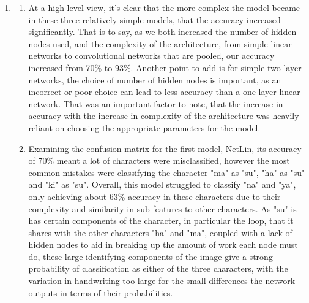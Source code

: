 \documentclass[a4paper,11pt]{article}
\begin{document}
{{\begin{enumerate}[leftmargin=*]
\begin{align*}
\begin{bmatrix}
					3 & 933 & 11 & 4 & 5 & 14 & 6 & 5 & 14 & 10 \\
					2 & 7 & 864 & 15 & 2 & 35 & 16 & 4 & 8 & 0 \\
					1 & 1 & 36 & 947 & 4 & 4 & 3 & 1 & 1 & 2 \\
					32 & 11 & 17 & 7 & 928 & 5 & 6 & 6 & 5 & 5 \\
					1 & 1 & 5 & 3 & 3 & 901 & 1 & 1 & 2 & 0 \\
					1 & 29 & 24 & 10 & 13 & 21 & 960 & 10 & 6 & 0 \\
					11 & 6 & 21 & 6 & 14 & 12 & 5 & 946 & 2 & 4 \\
					2 & 3 & 6 & 3 & 8 & 3 & 0 & 3 & 954 & 3 \\
					2 & 6 & 7 & 4 & 6 & 3 & 0 & 18 & 1 & 971 \\
				\end{bmatrix}
			\end{align*}
			with an accuracy of 9349/10000 or 93\%. Using a learning rate of 0.02 gives an accuracy of 95\%.
		\item
			\begin{enumerate}
				\item At a high level view, it's clear that the more complex the model became in these three relatively simple models, that the accuracy increased significantly. That is to say, as we both increased the number of hidden nodes used, and the complexity of the architecture, from simple linear networks to convolutional networks that are pooled, our accuracy increased from 70\% to 93\%. Another point to add is for simple two layer networks, the choice of number of hidden nodes is important, as an incorrect or poor choice can lead to less accuracy than a one layer linear network. That was an important factor to note, that the increase in accuracy with the increase in complexity of the architecture was heavily reliant on choosing the appropriate parameters for the model.
				\item Examining the confusion matrix for the first model, NetLin, its accuracy of 70\% meant a lot of characters were misclassified, however the most common mistakes were classifying the character "ma" as "su", "ha" as "su" and "ki" as "su". Overall, this model struggled to classify "na" and "ya", only achieving about 63\% accuracy in these characters due to their complexity and similarity in sub features to other characters. As "su" is has certain components of the character, in particular the loop, that it shares with the other characters "ha" and "ma", coupled with a lack of hidden nodes to aid in breaking up the amount of work each node must do, these large identifying components of the image give a strong probability of classification as either of the three characters, with the variation in handwriting too large for the small differences the network outputs in terms of their probabilities.

\end{enumerate}
\end{enumerate}}}
\end{document}
